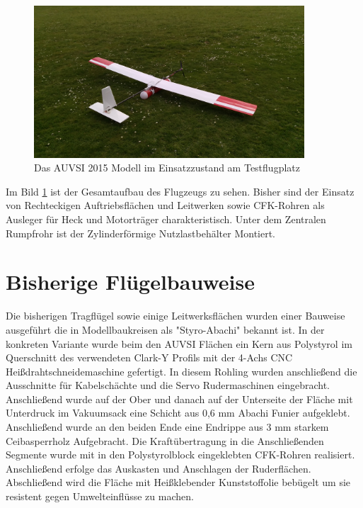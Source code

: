\begin{figure}[H]
\centering
\includegraphics[width=0.9\textwidth]{bilder/Fotos/AUVSI_2015.jpg} 
\caption{Das AUVSI 2015 Modell im Einsatzzustand am Testflugplatz} 
\label{fig:Das AUVSI 2015 Modell in Einsatzzustand am Testflugplatz}
\end{figure}

Im Bild \ref{fig:Das AUVSI 2015 Modell in Einsatzzustand am Testflugplatz} ist der Gesamtaufbau des Flugzeugs zu sehen. Bisher sind der Einsatz von Rechteckigen Auftriebsflächen und Leitwerken sowie CFK-Rohren als Ausleger für Heck und Motorträger charakteristisch. Unter dem Zentralen Rumpfrohr ist der Zylinderförmige Nutzlastbehälter Montiert.


\clearpage


\section{Bisherige Flügelbauweise}

Die bisherigen Tragflügel sowie einige Leitwerksflächen wurden einer Bauweise ausgeführt die in Modellbaukreisen als "Styro-Abachi" bekannt ist. In der konkreten Variante wurde beim den AUVSI Flächen ein Kern aus Polystyrol im Querschnitt des verwendeten Clark-Y Profils mit der 4-Achs CNC Heißdrahtschneidemaschine gefertigt. In diesem Rohling wurden anschließend die Ausschnitte für Kabelschächte und die Servo Rudermaschinen eingebracht. Anschließend wurde auf der Ober und danach auf der Unterseite der Fläche mit Unterdruck im Vakuumsack eine Schicht aus 0,6 mm Abachi Funier aufgeklebt.
Anschließend wurde an den beiden Ende eine Endrippe aus 3 mm starkem Ceibasperrholz Aufgebracht. Die Kraftübertragung in die Anschließenden Segmente wurde mit in den Polystyrolblock eingeklebten CFK-Rohren realisiert.
Anschließend erfolge das Auskasten und Anschlagen der Ruderflächen.
Abschließend wird die Fläche mit Heißklebender Kunststoffolie bebügelt um sie resistent gegen Umwelteinflüsse zu machen.

